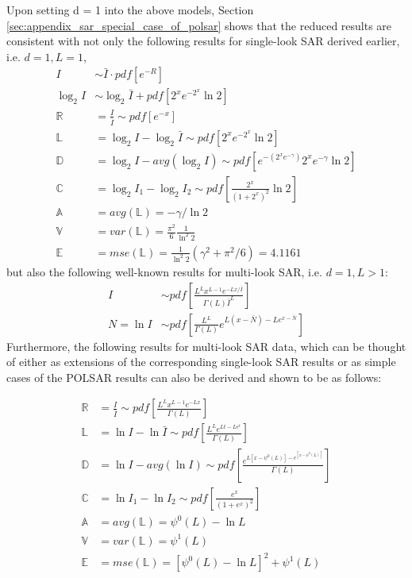Upon setting d = 1 into the above models,
  Section \ref{sec:appendix_sar_special_case_of_polsar} shows that the reduced results
are consistent with not only the following results for single-look SAR derived earlier, i.e. $d =1,  L = 1$,
\begin{align*}
  I &\sim \bar{I} \cdot pdf \left[ e^{-R} \right] \\
  \log_2{I} &\sim \log_2{\bar{I}} + pdf \left[ 2^xe^{-2^x}\ln2 \right] \\
  \mathbb{R} &= \frac{I}{\bar{I}} \sim pdf \left[ e^{-x} \right]  \\
  \mathbb{L} &= \log_2{I} - \log_2{\bar{I}} \sim pdf \left[ 2^xe^{-2^x}\ln2 \right]\\
  \mathbb{D} &= \log_2{I} - avg(\log_2{I}) \sim pdf \left[ e^{-(2^xe^{-\gamma})} 2^xe^{-\gamma} \ln2 \right] \\
  \mathbb{C} &= \log_2{I_1} - \log_2{I_2} \sim pdf \left[ \frac{2^x}{(1+2^x)^2} \ln2 \right] \\
  \mathbb{A} &= avg(\mathbb{L}) = -\gamma / \ln{2} \\
  \mathbb{V} &= var(\mathbb{L}) = \frac{\pi^2}{6} \frac{1}{ \ln^2{2}} \\
  \mathbb{E} &= mse(\mathbb{L}) = \frac{1}{\ln^2{2}}( \gamma^2 + \pi^2/6 ) = 4.1161 
\end{align*}
but also the following well-known results for multi-look SAR, i.e. $d=1,L>1$:
  \begin{align*}
I &\sim pdf \left[ \frac{L^L x^{L-1} e^{-Lx/\bar{I}}}{\Gamma(L) \bar{I}^L} \right] \\
N = \ln{I} &\sim pdf \left[ \frac{L^L}{\Gamma(L)} e^{L(x-\bar{N})-Le^{x-\bar{N}}} \right]
  \end{align*}
Furthermore, the following results for multi-look SAR data, which can be thought of
either as extensions of the corresponding single-look SAR results or as simple cases of
the POLSAR results can also be derived and shown to be as follows:

  \begin{align*}
    \mathbb{R} &= \frac{I}{\bar{I}} \sim pdf \left[ \frac{ L^{L} x^{L-1} e^{-Lx}}{ \Gamma(L)} \label{eqn:multi_look_SAR_ratio_dist} \right]\\
    \mathbb{L} &= \ln{I} - \ln{\bar{I}} \sim pdf \left[ \frac{L^Le^{Lt-Le^t}}{ \Gamma(L)}  \right] \\
    \mathbb{D} &= \ln{I} - avg(\ln{I}) \sim pdf \left[ \frac{e^{L[x-\psi^0(L)]-e^{[x-\psi^0(L)]}}}{\Gamma(L)} \right] \\
    \mathbb{C} &= \ln{I_1} - \ln{I_2} \sim pdf \left[ \frac{e^{x}}{(1+e^x)^{2}} \right] \\
    \mathbb{A} &= avg(\mathbb{L}) = \psi^0(L) - \ln{L} \\
    \mathbb{V} &= var(\mathbb{L}) = \psi^1(L) \\
    \mathbb{E} &= mse(\mathbb{L}) = \left[ \psi^0(L) - \ln{L} \right]^2 + \psi^1(L)
  \end{align*}

